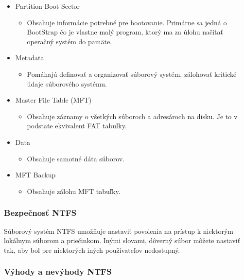 \documentclass[12pt,oneside,slovak,a4paper]{article}
\begin{document}
\begin{itemize}
	\item Partition Boot Sector
		\begin{itemize}
			\item Obsahuje informácie potrebné pre bootovanie. Primárne sa jedná o BootStrap čo je vlastne malý program, ktorý ma za úlohu načítať operačný systém do pamäte.
		\end{itemize}
	\item Metadata
		\begin{itemize}
			\item Pomáhajú definovať a organizovať súborový systém, zálohovať kritické údaje súborového systému.
		\end{itemize}
	\item Master File Table (MFT)
		\begin{itemize}
			\item Obsahuje záznamy o všetkých súboroch a adresároch na disku. Je to v podstate ekvivalent FAT tabuľky.
		\end{itemize}
	\item Data
		\begin{itemize}
			\item Obsahuje samotné dáta súborov.
		\end{itemize}
	\item MFT Backup
		\begin{itemize}
			\item Obsahuje zálohu MFT tabuľky.
		\end{itemize}
\end{itemize}

\subsubsection{Bezpečnosť NTFS}
Súborový systém NTFS umožňuje nastaviť povolenia na prístup k niektorým lokálnym súborom a priečinkom. Inými slovami, dôverný súbor môžete nastaviť tak, aby bol pre niektorých iných používateľov nedostupný.



\subsubsection{Výhody a nevýhody NTFS}
\end{document}
